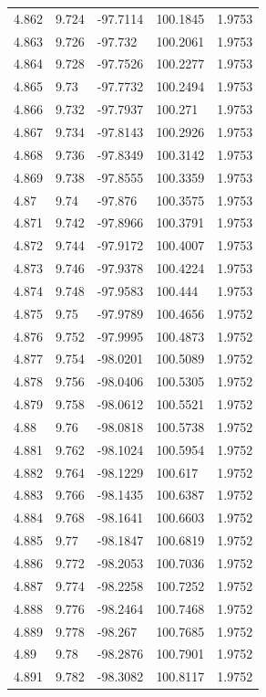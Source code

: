 \begin{tabular}{lllll}
4.862 & 9.724 & -97.7114 & 100.1845 & 1.9753 \\
4.863 & 9.726 & -97.732 & 100.2061 & 1.9753 \\
4.864 & 9.728 & -97.7526 & 100.2277 & 1.9753 \\
4.865 & 9.73 & -97.7732 & 100.2494 & 1.9753 \\
4.866 & 9.732 & -97.7937 & 100.271 & 1.9753 \\
4.867 & 9.734 & -97.8143 & 100.2926 & 1.9753 \\
4.868 & 9.736 & -97.8349 & 100.3142 & 1.9753 \\
4.869 & 9.738 & -97.8555 & 100.3359 & 1.9753 \\
4.87 & 9.74 & -97.876 & 100.3575 & 1.9753 \\
4.871 & 9.742 & -97.8966 & 100.3791 & 1.9753 \\
4.872 & 9.744 & -97.9172 & 100.4007 & 1.9753 \\
4.873 & 9.746 & -97.9378 & 100.4224 & 1.9753 \\
4.874 & 9.748 & -97.9583 & 100.444 & 1.9753 \\
4.875 & 9.75 & -97.9789 & 100.4656 & 1.9752 \\
4.876 & 9.752 & -97.9995 & 100.4873 & 1.9752 \\
4.877 & 9.754 & -98.0201 & 100.5089 & 1.9752 \\
4.878 & 9.756 & -98.0406 & 100.5305 & 1.9752 \\
4.879 & 9.758 & -98.0612 & 100.5521 & 1.9752 \\
4.88 & 9.76 & -98.0818 & 100.5738 & 1.9752 \\
4.881 & 9.762 & -98.1024 & 100.5954 & 1.9752 \\
4.882 & 9.764 & -98.1229 & 100.617 & 1.9752 \\
4.883 & 9.766 & -98.1435 & 100.6387 & 1.9752 \\
4.884 & 9.768 & -98.1641 & 100.6603 & 1.9752 \\
4.885 & 9.77 & -98.1847 & 100.6819 & 1.9752 \\
4.886 & 9.772 & -98.2053 & 100.7036 & 1.9752 \\
4.887 & 9.774 & -98.2258 & 100.7252 & 1.9752 \\
4.888 & 9.776 & -98.2464 & 100.7468 & 1.9752 \\
4.889 & 9.778 & -98.267 & 100.7685 & 1.9752 \\
4.89 & 9.78 & -98.2876 & 100.7901 & 1.9752 \\
4.891 & 9.782 & -98.3082 & 100.8117 & 1.9752 \\

\end{tabular}
